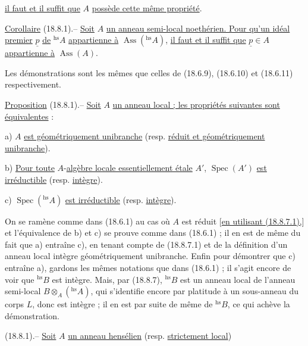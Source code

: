 \uline{il faut et il suffit que} $A$ \uline{possède cette même propriété}.

\uline{Corollaire} (18.8.1).-- \uline{Soit} $A$ \uline{un anneau semi-local noethérien. Pour qu'un idéal premier} $\underline p$ \uline{de} ${}^{\mathrm{hs}}A$ \uline{appartienne à} $\operatorname{Ass}({}^{\mathrm{hs}}A)$, \uline{il faut et il suffit que} $\underline p\in A$ \uline{appartienne à} $\operatorname{Ass}(A)$.

Les démonstrations sont les mêmes que celles de (18.6.9), (18.6.10) et (18.6.11) respectivement.

\uline{Proposition} (18.8.1).-- \uline{Soit} $A$ \uline{un anneau local ; les propriétés suivantes sont équivalentes} :

a) $A$ \uline{est géométriquement unibranche} (resp. \uline{réduit et géométriquement unibranche}).

b) \uline{Pour toute} $A$-\uline{algèbre locale essentiellement étale} $A'$, $\operatorname{Spec}(A')$ \uline{est irréductible} (resp. \uline{intègre}).

c) $\operatorname{Spec}({}^{\mathrm{hs}}A)$ \uline{est irréductible} (resp. \uline{intègre}).

On se ramène comme dans (18.6.1) au cas où $A$ est réduit [\uline{en utilisant (18.8.7.1),}] et l'équivalence de b) et c) se prouve comme dans (18.6.1) ; il en est de même du fait que a) entraîne c), en tenant compte de (18.8.7.1) et de la définition d'un anneau local intègre géométriquement unibranche. Enfin pour démontrer que c) entraîne a), gardons les mêmes notations que dans (18.6.1) ; il s'agit encore de voir que ${}^{\mathrm{hs}}B$ est intègre. Mais, par (18.8.7), ${}^{\mathrm{hs}}B$ est un anneau local de l'anneau semi-local $B\otimes_A({}^{\mathrm{hs}}A)$, qui s'identifie encore par platitude à un sous-anneau du corps $L$, donc est intègre ; il en est par suite de même de ${}^{\mathrm{hs}}B$, ce qui achève la démonstration.

  (18.8.1).-- \uline{Soit} $A$ \uline{un anneau  hensélien} (resp. \uline{strictement local})



